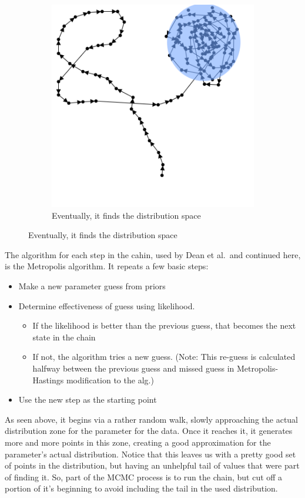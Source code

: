 \documentclass [letterpaper, 12pt] {article}
\begin{document}
\begin{figure}[H]
\begin{subfigure}{0.5\textwidth}
		\includegraphics[width=\linewidth]{mcmc-circling}
		\caption{Eventually, it finds the distribution space}
	\end{subfigure}
\end{figure}

The algorithm for each step in the cahin, used by Dean et al.\ and continued here, is the Metropolis algorithm. It repeats a few basic steps:

\begin{itemize}
	\item Make a new parameter guess from priors
	\item Determine effectiveness of guess using likelihood.
	      \begin{itemize}
		      \item If the likelihood is better than the previous guess, that becomes the next state in the chain
		      \item If not, the algorithm tries a new guess. (Note: This re-guess is calculated halfway between the previous guess and missed guess in Metropolis-Hastings modification to the alg.)
	      \end{itemize}
	\item Use the new step as the starting point
\end{itemize}

As seen above, it begins via a rather random walk, slowly approaching the actual distribution zone for the parameter for the data. Once it reaches it, it generates more and more points in this zone, creating a good approximation for the parameter's actual distribution.
Notice that this leaves us with a pretty good set of points in the distribution, but having an unhelpful tail of values that were part of finding it. So, part of the MCMC process is to run the chain, but cut off a portion of it's beginning to avoid including the tail in the used distribution.
\end{document}
